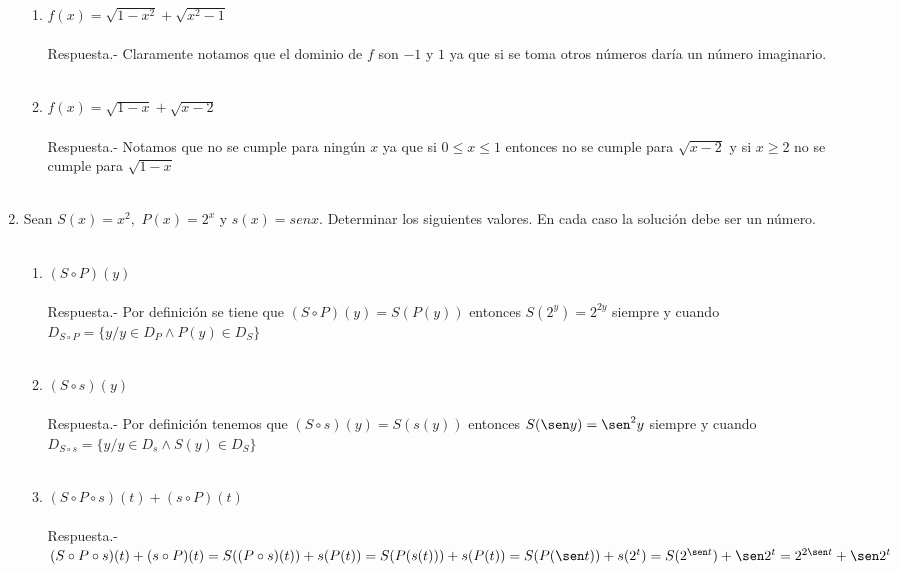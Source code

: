 \begin{enumerate}[\bfseries 1.]
\begin{enumerate}[\bfseries (i)]
	    \item $f(x)=\sqrt{1-x^2} + \sqrt{x^2-1}$\\\\
	    Respuesta.- \; Claramente notamos que el dominio de $f$ son $-1$ y $1$ ya que si se toma otros números daría un número imaginario.\\\\

	    \item $f(x)=\sqrt{1-x}+\sqrt{x-2}$\\\\
	    Respuesta.- \; Notamos que no se cumple para ningún $x$ ya que si $0\leq x \leq 1$ entonces no se cumple para $\sqrt{x-2} $ y si $x\geq 2$ no se cumple para $\sqrt{1-x}$\\\\ 

	    \end{enumerate}

	\item Sean $S(x)=x^2,$ $P(x)=2^x$ y $s(x)=sen x$. Determinar los siguientes valores. En cada caso la solución debe ser un número.\\\\

	\begin{enumerate}[\bfseries (i)]

	    \item $(S \circ P)(y)$\\\\
	    Respuesta.- \; Por definición se tiene que $(S \circ P)(y)=S(P(y))$ entonces $S(2^y)=2^{2y}$ siempre y cuando $D_{S \circ P}=\lbrace y / y \in D_P \land P(y) \in D_S\rbrace$\\\\
	    
	    \item $(S \circ s)(y)$\\\\
	    Respuesta.- \; Por definición tenemos que $(S \circ s)(y)=S(s(y))$ entonces $S(\sen y)=\sen^2 y$ siempre y cuando $D_{S \circ s}=\lbrace y / y \in D_s \land S(y) \in D_S \rbrace$\\\\

	    \item $(S \circ P \circ s)(t)+(s \circ P)(t)$\\\\
	    Respuesta.- \; $(S \circ P \circ s)(t)+(s \circ P)(t) = S((P \circ s)(t))+s(P(t)) = S(P(s(t))) + s(P(t))=S(P(\sen t)) + s(2^t)=S(2^{\sen t}) +  \sen 2^t = 2^{2 \sen t} +\sen 2^t$\\\\  


\end{enumerate}
\end{enumerate}
